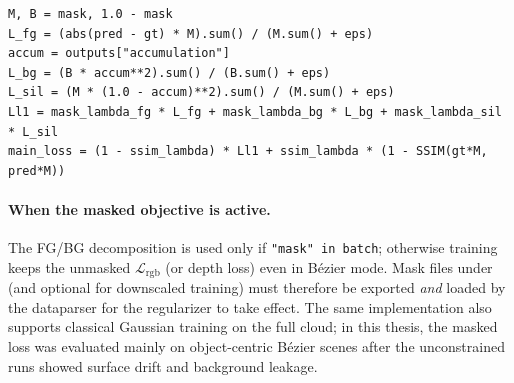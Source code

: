 \begin{lstlisting}[caption={FG/BG decomposed loss, emptiness mode (\filepath{splatfacto.py}, RGB; branch used in reported runs).},label={lst:mask_loss}]
M, B = mask, 1.0 - mask
L_fg = (abs(pred - gt) * M).sum() / (M.sum() + eps)
accum = outputs["accumulation"]
L_bg = (B * accum**2).sum() / (B.sum() + eps)
L_sil = (M * (1.0 - accum)**2).sum() / (M.sum() + eps)
Ll1 = mask_lambda_fg * L_fg + mask_lambda_bg * L_bg + mask_lambda_sil * L_sil
main_loss = (1 - ssim_lambda) * Ll1 + ssim_lambda * (1 - SSIM(gt*M, pred*M))
\end{lstlisting}

\paragraph{When the masked objective is active.}
The FG/BG decomposition is used only if \texttt{"mask" in batch}; otherwise training keeps the unmasked $\mathcal{L}_{\mathrm{rgb}}$ (or depth loss) even in B\'ezier mode. Mask files under  (and optional  for downscaled training) must therefore be exported \emph{and} loaded by the dataparser for the regularizer to take effect. The same implementation also supports classical Gaussian training on the full cloud; in this thesis, the masked loss was evaluated mainly on object-centric B\'ezier scenes after the unconstrained runs showed surface drift and background leakage.

